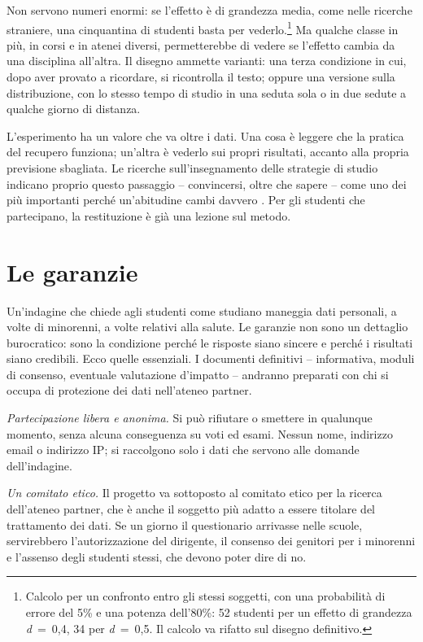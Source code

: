 Non servono numeri enormi: se l'effetto è di grandezza media, come
nelle ricerche straniere, una cinquantina di studenti basta per
vederlo.\footnote{Calcolo per un confronto entro gli stessi soggetti,
con una probabilità di errore del 5\% e una potenza dell'80\%: 52
studenti per un effetto di grandezza \emph{d}~=~0,4, 34 per \emph{d}~=~0,5.
Il calcolo va rifatto sul disegno definitivo.} Ma qualche classe in più,
in corsi e in atenei diversi, permetterebbe di vedere se l'effetto
cambia da una disciplina all'altra. Il disegno ammette varianti: una
terza condizione in cui, dopo aver provato a ricordare, si ricontrolla
il testo; oppure una versione sulla distribuzione, con lo stesso tempo
di studio in una seduta sola o in due sedute a qualche giorno di
distanza.

L'esperimento ha un valore che va oltre i dati. Una cosa è leggere che
la pratica del recupero funziona; un'altra è vederlo sui propri
risultati, accanto alla propria previsione sbagliata. Le ricerche
sull'insegnamento delle strategie di studio indicano proprio questo
passaggio -- convincersi, oltre che sapere -- come uno dei più
importanti perché un'abitudine cambi davvero \parencite{mcdaniel2020}.
Per gli studenti che partecipano, la restituzione è già una lezione sul
metodo.

\section{Le garanzie}
\label{sec:indagine-garanzie}

Un'indagine che chiede agli studenti come studiano maneggia dati
personali, a volte di minorenni, a volte relativi alla salute. Le
garanzie non sono un dettaglio burocratico: sono la condizione perché
le risposte siano sincere e perché i risultati siano credibili. Ecco
quelle essenziali. I documenti definitivi -- informativa, moduli di
consenso, eventuale valutazione d'impatto -- andranno preparati con chi
si occupa di protezione dei dati nell'ateneo partner.

\emph{Partecipazione libera e anonima.} Si può rifiutare o smettere in
qualunque momento, senza alcuna conseguenza su voti ed esami. Nessun
nome, indirizzo email o indirizzo IP; si raccolgono solo i dati che
servono alle domande dell'indagine.

\emph{Un comitato etico.} Il progetto va sottoposto al comitato etico
per la ricerca dell'ateneo partner, che è anche il soggetto più adatto
a essere titolare del trattamento dei dati. Se un giorno il questionario
arrivasse nelle scuole, servirebbero l'autorizzazione del dirigente, il
consenso dei genitori per i minorenni e l'assenso degli studenti stessi,
che devono poter dire di no.

